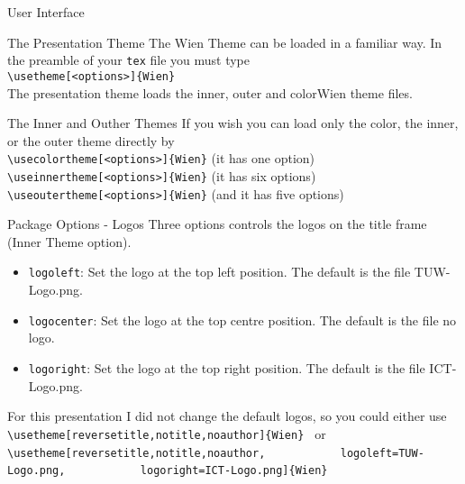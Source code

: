 \documentclass{beamer}
\begin{document}
  
\begin{frame}{User Interface}
  \begin{block}{The Presentation Theme}
     The Wien Theme can be loaded in a familiar way. In the preamble
     of your {\tt tex} file you must type\\
     \vspace{5pt}  
    {\tt \textbackslash usetheme[<options>]\{Wien\}}\\ \vspace{5pt} 
    The presentation theme loads the inner, outer and colorWien theme files.
  \end{block}
  \begin{block}{The Inner and Outher Themes}
    If you wish you can load only the color, the inner, or the outer theme directly by\\ \vspace{5pt} 
    {\tt \textbackslash usecolortheme[<options>]\{Wien\}} (it has one option)\\ \vspace{5pt} 
    {\tt \textbackslash useinnertheme[<options>]\{Wien\}} (it has six options)\\ \vspace{5pt} 
    {\tt \textbackslash useoutertheme[<options>]\{Wien\}} (and it has five options)\\
  \end{block}
  
\end{frame}

\begin{frame}[fragile]{Package Options - Logos}
   Three options controls the logos on the title frame (Inner Theme option).
  
\begin{itemize}
\item \texttt{logoleft}: Set the logo at the top left position. The default is the file TUW-Logo.png.
\item \texttt{logocenter}: Set the logo at the top centre position. The default is the file no logo.
\item \texttt{logoright}: Set the logo at the top right position. The default is the file ICT-Logo.png.
\end{itemize}

For this presentation I did not change the default logos, so you could either use
\verb| \usetheme[reversetitle,notitle,noauthor]{Wien} |
or
\verb| \usetheme[reversetitle,notitle,noauthor,|
\verb|           logoleft=TUW-Logo.png,|
\verb|           logoright=ICT-Logo.png]{Wien} |


\end{frame}
\end{document}
